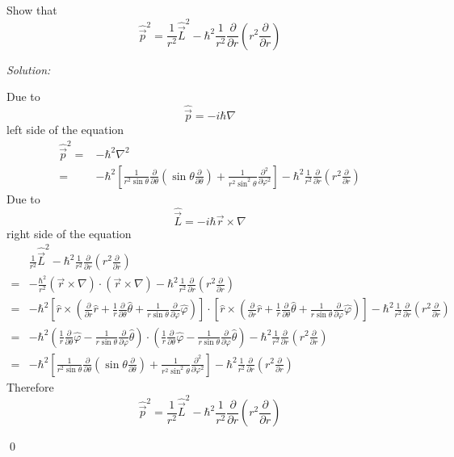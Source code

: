 \documentclass[12pt]{article}
\newenvironment{problem}[2][Problem]{\begin{trivlist}
\item[\hskip \labelsep {\bfseries #1}\hskip \labelsep {\bfseries #2.}]}{\end{trivlist}}
\newenvironment{sol}
    {\emph{Solution:}
    }
    {
    \qed
    }
\begin{document}
\begin{problem}{2}
Show that
\[
\hat{\vec{p}}^2=\frac{1}{r^2}\hat{\vec{L}}^2-\hbar^2\frac{1}{r^2}\frac{\partial}{\partial r}(r^2\frac{\partial}{\partial r})
\]
\end{problem}
\begin{sol}
Due to
\begin{equation}
\hat{\vec{p}}=-i\hbar\nabla
\end{equation}
left side of the equation
\begin{align}
\nonumber\hat{\vec{p}}^2=&-\hbar^2\nabla^2\\
=&-\hbar^2[\frac{1}{r^2\sin\theta}\frac{\partial}{\partial\theta}(\sin\theta\frac{\partial}{\partial\theta})+\frac{1}{r^2\sin^2\theta}\frac{\partial^2}{\partial\varphi^2}]-\hbar^2\frac{1}{r^2}\frac{\partial}{\partial r}(r^2\frac{\partial}{\partial r})
\end{align}
Due to
\begin{equation}
\hat{\vec{L}}=-i\hbar\vec{r}\times\nabla
\end{equation}
right side of the equation
\begin{align}
\nonumber&\frac{1}{r^2}\hat{\vec{L}}^2-\hbar^2\frac{1}{r^2}\frac{\partial}{\partial r}(r^2\frac{\partial}{\partial r})\\
\nonumber=&-\frac{\hbar^2}{r^2}(\vec{r}\times\nabla)\cdot(\vec{r}\times\nabla)-\hbar^2\frac{1}{r^2}\frac{\partial}{\partial r}(r^2\frac{\partial}{\partial r})\\
\nonumber=&-\hbar^2[\hat{r}\times(\frac{\partial}{\partial r}\hat{r}+\frac{1}{r}\frac{\partial}{\partial\theta}\hat{\theta}+\frac{1}{r\sin\theta}\frac{\partial}{\partial\varphi}\hat{\varphi})]\cdot[\hat{r}\times(\frac{\partial}{\partial r}\hat{r}+\frac{1}{r}\frac{\partial}{\partial\theta}\hat{\theta}+\frac{1}{r\sin\theta}\frac{\partial}{\partial\varphi}\hat{\varphi})]-\hbar^2\frac{1}{r^2}\frac{\partial}{\partial r}(r^2\frac{\partial}{\partial r})\\
\nonumber=&-\hbar^2(\frac{1}{r}\frac{\partial}{\partial\theta}\hat{\varphi}-\frac{1}{r\sin\theta}\frac{\partial}{\partial\varphi}\hat{\theta})\cdot(\frac{1}{r}\frac{\partial}{\partial\theta}\hat{\varphi}-\frac{1}{r\sin\theta}\frac{\partial}{\partial\varphi}\hat{\theta})-\hbar^2\frac{1}{r^2}\frac{\partial}{\partial r}(r^2\frac{\partial}{\partial r})\\
=&-\hbar^2[\frac{1}{r^2\sin\theta}\frac{\partial}{\partial\theta}(\sin\theta\frac{\partial}{\partial\theta})+\frac{1}{r^2\sin^2\theta}\frac{\partial^2}{\partial\varphi^2}]-\hbar^2\frac{1}{r^2}\frac{\partial}{\partial r}(r^2\frac{\partial}{\partial r})
\end{align}
Therefore
\begin{equation}
\hat{\vec{p}}^2=\frac{1}{r^2}\hat{\vec{L}}^2-\hbar^2\frac{1}{r^2}\frac{\partial}{\partial r}(r^2\frac{\partial}{\partial r})
\end{equation}
\end{sol}
\end{document}
